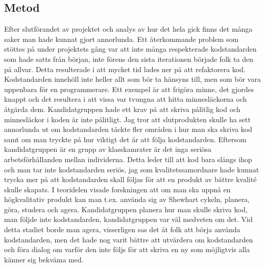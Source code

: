 \subsection{Metod}
Efter slutförandet av projektet och analys av hur det hela gick finns det många saker man hade kunnat gjort annorlunda. Ett återkommande problem som stöttes på under projektets gång var att inte många respekterade kodstandarden som hade satts från början, inte förens den sista iterationen började folk ta den på allvar. Detta resulterade i att mycket tid lades ner på att refaktorera kod. Kodstandarden innehöll inte heller allt som bör ta hänsyns till, men som bör vara uppenbara för en programmerare. Ett exempel är att frigöra minne, det gjordes knappt och det resultera i att vissa var tvungna att hitta minnesläckorna och åtgärda dem. Kandidatgruppen hade ett krav på att skriva pålitlig kod och minnesläckor i koden är inte pålitligt.
\newline
\newline
Jag tror att slutprodukten skulle ha sett annorlunda ut om kodstandarden täckte fler områden i hur man ska skriva kod samt om man tryckte på hur viktigt det är att följa kodstandarden. Eftersom kandidatgruppen är en grupp av klasskamrater är det inga seriösa arbetsförhållanden mellan individerna. Detta leder till att kod bara slängs ihop och man tar inte kodstandarden seriös, jag som kvalitetssamordnare hade kunnat trycka mer på att kodstandarden skall följas för att en produkt av bättre kvalité skulle skapats.
\newline
\newline
I teoridelen visade forskningen att om man ska uppnå en högkvalitativ produkt kan man t.ex. använda sig av Shewhart cykeln, planera, göra, studera och agera. Kandidatgruppen planera hur man skulle skriva kod, man följde inte kodstandarden, kandidatgruppen var väl medveten om det. Vid detta stadiet borde man agera, visserligen sas det åt folk att börja använda kodstandarden, men det hade nog varit bättre att utvärdera om kodstandarden och föra dialog om varför den inte följs för att skriva en ny som möjligtvis alla känner sig bekväma med.